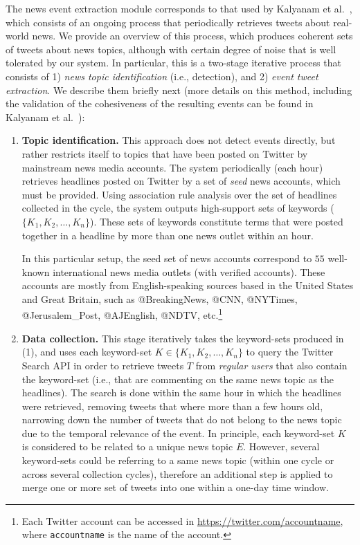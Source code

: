  The news event extraction module
corresponds to that used by Kalyanam et al.~\cite{10.1371/journal.pone.0166694},
which consists of an ongoing process that periodically retrieves
tweets about real-world news. We provide an
overview of this process, which produces coherent sets of tweets about news topics,
although with certain degree of noise that is well tolerated by our system. In particular,
this is a two-stage iterative process that consists of 1) {\em news topic
identification} (i.e., detection), and 2) {\em event tweet extraction}. We describe them
briefly next (more details on this method, including the validation of the cohesiveness
of the resulting events can be found in Kalyanam et al.~\cite{10.1371/journal.pone.0166694}):

\begin{enumerate}

\item{\bf Topic identification.} This approach does not detect events
directly, but rather restricts itself to topics that have been posted on Twitter by
mainstream news media accounts. The system
periodically (each hour) retrieves headlines posted on Twitter by a set of
{\em seed} news accounts, which must be provided.  Using
association rule analysis over the set of headlines collected in the cycle,
the system outputs high-support sets of keywords ($\{K_1,
K_2,\ldots, K_n\}$). These sets of keywords constitute terms that were
posted together in a headline by more than one news outlet within an hour.

In this particular setup, the seed set of news accounts correspond to
$55$ well-known international news media outlets (with verified
accounts). These accounts are mostly from English-speaking sources
based in the United States and Great Britain, such as @BreakingNews,
@CNN, @NYTimes, @Jerusalem\_Post, @AJEnglish, @NDTV,
etc.\footnote{Each Twitter account can be accessed
in \url{https://twitter.com/accountname}, where \texttt{accountname}
is the name of the account.}

\item{\bf Data collection.} This stage iteratively
takes the keyword-sets produced in (1), and uses each keyword-set
$K \in \{K_1, K_2,\ldots, K_n\}$ to query the Twitter Search API in
order to retrieve tweets $T$ from {\em regular users} that also contain the keyword-set
(i.e., that are commenting on the same news topic as the headlines).
The search is done within
the same hour in which the headlines were retrieved, removing tweets that
where more than a few hours old, narrowing down the
number of tweets that do not belong to the news topic due to the temporal
relevance of the event. In principle,
each keyword-set $K$ is considered to be related to a unique news
topic $E$. However, several keyword-sets could be referring to a same
news topic (within one cycle or across several collection cycles),
therefore an additional step is applied to merge one or more set of
tweets into one within a one-day time window.

\end{enumerate}

